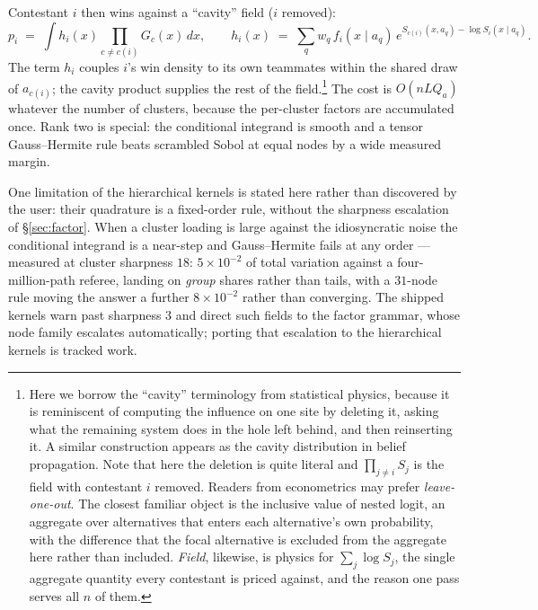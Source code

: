 \documentclass[11pt]{article}
\begin{document}
Contestant $i$ then wins against a ``cavity'' field ($i$ removed):
\begin{equation}\label{eq:cavity}
p_i \;=\; \int h_i(x)\prod_{c\ne c(i)}G_c(x)\,dx,
\qquad
h_i(x) \;=\; \sum_q w_q\, f_i(x\mid a_q)\,e^{S_{c(i)}(x,a_q)-\log S_i(x\mid a_q)}.
\end{equation}
The term $h_i$ couples $i$'s win density to its own teammates within the shared
draw of $a_{c(i)}$; the cavity product supplies the rest of the field.\footnote{Here we borrow the ``cavity'' terminology from statistical physics, because it is reminiscent of computing the influence on one site by deleting it,
asking what the remaining system does in the hole left behind, and then
reinserting it. A similar construction appears as the cavity distribution
in belief propagation. Note that here the deletion is quite literal and $\prod_{j\ne i}S_j$
is the field with contestant $i$ removed. Readers from econometrics may
prefer \emph{leave-one-out}. The closest familiar object is the inclusive
value of nested logit, an aggregate over alternatives that enters each
alternative's own probability, with the difference that the focal
alternative is excluded from the aggregate here rather than included.
\emph{Field}, likewise, is physics for $\sum_j\log S_j$, the single
aggregate quantity every contestant is priced against, and the reason one
pass serves all $n$ of them.}
The cost
is $O(nLQ_a)$ whatever the number of clusters, because the per-cluster factors
are accumulated once. Rank two is special: the conditional integrand is smooth
and a tensor Gauss--Hermite rule beats scrambled Sobol at equal nodes by a wide
measured margin.

One limitation of the hierarchical kernels is stated here rather than
discovered by the user: their quadrature is a fixed-order rule, without
the sharpness escalation of \S\ref{sec:factor}. When a cluster loading
is large against the idiosyncratic noise the conditional integrand is a
near-step and Gauss--Hermite fails at any order --- measured at cluster
sharpness $18$: $5\times10^{-2}$ of total variation against a
four-million-path referee, landing on \emph{group} shares rather than
tails, with a $31$-node rule moving the answer a further $8\times10^{-2}$
rather than converging. The shipped kernels warn past sharpness $3$ and
direct such fields to the factor grammar, whose node family escalates
automatically; porting that escalation to the hierarchical kernels is
tracked work.
\end{document}
